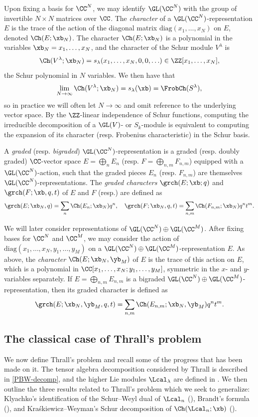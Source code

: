 Upon fixing a basis for $\CC^N$, we may identify $\GL(\CC^N)$ with the group of invertible $N \times N$ matrices over $\CC$. The \emph{character} of a $\GL(\CC^N)$-representation $E$ is the trace of the action of the diagonal matrix $\mathrm{diag}(x_1,\ldots,x_N)$ on $E$, denoted $\Ch(E;\xb_N)$. The character $\Ch(E;\xb_N)$ is a polynomial in the variables $\xb_N = x_1,\ldots,x_N$, and the character of the Schur module $V^\lambda$ is
\[
\Ch(V^\lambda;\xb_N) = s_\lambda(x_1,\ldots,x_N,0,0,\ldots) \in \ZZ[x_1,\ldots,x_N],
\]
the Schur polynomial in $N$ variables. We then have that
\[
\lim_{N \to \infty} \Ch(V^\lambda;\xb_N) = s_\lambda(\xb) = \FrobCh(S^\lambda),
\]
so in practice we will often let $N \to \infty$ and omit reference to the underlying vector space. By the $\ZZ$-linear independence of Schur functions, computing the irreducible decomposition of a $\GL(V)$- or $S_k$-module is equivalent to computing the expansion of its character (resp. Frobenius characteristic) in the Schur basis.

A \emph{graded} (resp. \emph{bigraded}) $\GL(\CC^N)$-representation is a graded (resp. doubly graded) $\CC$-vector space $E = \bigoplus_n E_n$ (resp. $F = \bigoplus_{n,m} F_{n,m}$) equipped with a $\GL(\CC^N)$-action, such that the graded pieces $E_n$ (resp. $F_{n,m}$) are themselves $\GL(\CC^N)$-representations. The \emph{graded characters} $\grch(E;\xb;q)$ and $\grch(F;\xb,q,t)$ of $E$ and $F$ (resp.) are defined as
\[
\grch(E;\xb_N,q) = \sum_n \Ch(E_n;\xb_N)q^n, \quad \grch(F;\xb_N,q,t) = \sum_{n,m} \Ch(F_{n,m};\xb_N)q^nt^m.
\]

We will later consider representations of $\GL(\CC^N) \oplus \GL(\CC^M)$. After fixing bases for $\CC^N$ and $\CC^M$, we may consider the action of $\mathrm{diag}(x_1,\ldots,x_N,y_1,\ldots,y_M)$ on a $\GL(\CC^N) \oplus \GL(\CC^M)$-representation $E$. As above, the \emph{character} $\Ch(E;\xb_N,\yb_M)$ of $E$ is the trace of this action on $E$, which is a polynomial in $\CC[x_1,\ldots,x_N;y_1,\ldots,y_M]$, symmetric in the $x$- and $y$-variables separately. If $E = \bigoplus_{n,m} E_{n,m}$ is a bigraded $\GL(\CC^N) \oplus \GL(\CC^M)$-representation, then its graded character is defined as
\[
\grch(E;\xb_N,\yb_M,q,t) = \sum_{n,m} \Ch(E_{n,m};\xb_N,\yb_M)q^nt^m.
\]
\subsection{The classical case of Thrall's problem}\label{sec:Thrall-classical}
We now define Thrall's problem and recall some of the progress that has been made on it. The tensor algebra decomposition considered by Thrall is described in \eqref{PBW-decomp}, and the higher Lie modules $\Lcal_\lambda$ are defined in . We then outline the three results related to Thrall's problem which we seek to generalize: Klyachko's identification of the Schur--Weyl dual of $\Lcal_n$ (), Brandt's formula (), and Kra{\'s}kiewicz--Weyman's Schur decomposition of $\Ch(\Lcal_n;\xb)$ ().

